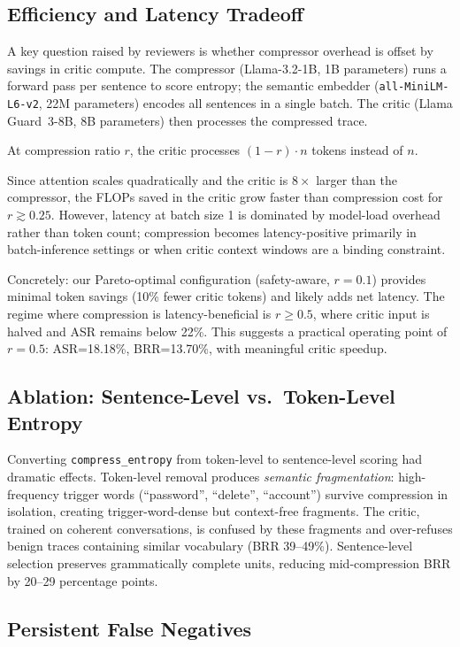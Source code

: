 \documentclass[11pt]{article}
\begin{document}
\subsection{Efficiency and Latency Tradeoff}

A key question raised by reviewers is whether compressor overhead is offset by savings in critic compute. The compressor (Llama-3.2-1B, 1B parameters) runs a forward pass per sentence to score entropy; the semantic embedder (\texttt{all-MiniLM-L6-v2}, 22M parameters) encodes all sentences in a single batch. The critic (Llama Guard~3-8B, 8B parameters) then processes the compressed trace.

At compression ratio $r$, the critic processes $(1{-}r)\cdot n$ tokens instead of $n$. 

Since attention scales quadratically and the critic is $8\times$ larger than the compressor, the FLOPs saved in the critic grow faster than compression cost for $r \gtrsim 0.25$. However, latency at batch size 1 is dominated by model-load overhead rather than token count; compression becomes latency-positive primarily in batch-inference settings or when critic context windows are a binding constraint.

Concretely: our Pareto-optimal configuration (safety-aware, $r{=}0.1$) provides minimal token savings (10\% fewer critic tokens) and likely adds net latency. The regime where compression is latency-beneficial is $r \geq 0.5$, where critic input is halved and ASR remains below 22\%. This suggests a practical operating point of $r{=}0.5$: ASR=18.18\%, BRR=13.70\%, with meaningful critic speedup.

\subsection{Ablation: Sentence-Level vs.\ Token-Level Entropy}

Converting \texttt{compress\_entropy} from token-level to sentence-level scoring had dramatic effects. Token-level removal produces \textit{semantic fragmentation}: high-frequency trigger words (``password'', ``delete'', ``account'') survive compression in isolation, creating trigger-word-dense but context-free fragments. The critic, trained on coherent conversations, is confused by these fragments and over-refuses benign traces containing similar vocabulary (BRR 39--49\%). Sentence-level selection preserves grammatically complete units, reducing mid-compression BRR by 20--29 percentage points.

\subsection{Persistent False Negatives}
\end{document}
